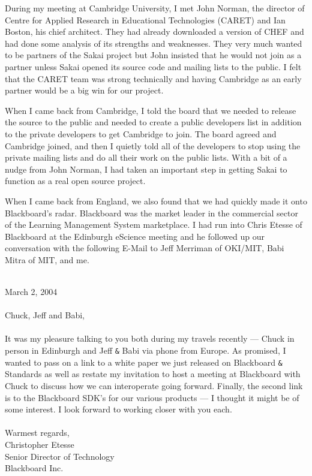 \documentclass[12pt]{book}
\begin{document}
During my meeting at Cambridge University, I met John Norman,
the director of Centre for Applied Research in Educational Technologies (CARET)
and Ian Boston, his chief architect.  They had already downloaded
a version of CHEF and had done some analysis of its strengths and weaknesses.  They very
much wanted to be partners of the Sakai project but John insisted that he would
not join as a partner unless Sakai opened its source code and mailing lists
to the public. I felt that the CARET team was strong technically and having
Cambridge as an early partner would be a big win for our project.

When I came back from Cambridge, I told the board that we needed to
release the source to the public and needed to create a public developers
list in addition to the private developers to get Cambridge to join.
The board agreed and Cambridge joined, and then I quietly told all of the
developers to stop using the private mailing lists and do all their work
on the public lists.  With a bit of a nudge from John Norman,
I had taken an important step in getting Sakai to function as a
real open source project.

When I came back from England, we also found that we had quickly
made it onto Blackboard's radar.  Blackboard was the market leader
in the commercial sector of the Learning Management System
marketplace.   I had run into Chris Etesse of Blackboard at the
Edinburgh eScience meeting and he followed up our conversation with
the following E-Mail to Jeff Merriman of OKI\slash MIT, Babi
Mitra of MIT, and me.\\
\\
\begin{sf}
March 2, 2004\\
\\
Chuck, Jeff and Babi,\\
\\
It was my pleasure talking to you both during my travels
recently --- Chuck in person in Edinburgh and Jeff \verb"&" Babi
via phone from Europe. As promised, I wanted to pass on
a link to a white paper we just released on Blackboard
\verb"&" Standards as well as restate my invitation to host a
meeting at Blackboard with Chuck to discuss how we can
interoperate going forward.  Finally, the second link
is to the Blackboard SDK's for our various products ---
I thought it might be of some interest. I look forward
to working closer with you each.\\
\\
Warmest regards,
\\
Christopher Etesse \\
Senior Director of Technology\\
Blackboard Inc. \\
\end{sf}
%
\end{document}
